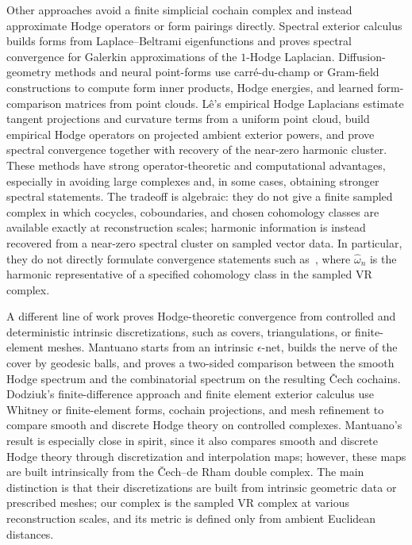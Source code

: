 \documentclass[11pt,reqno]{amsproc}
\numberwithin{equation}{section}
\theoremstyle{definition}
\theoremstyle{plain}
\begin{document}
Other approaches avoid a finite simplicial cochain complex and instead approximate Hodge operators or form pairings directly. Spectral exterior calculus \cite{Berry2020} builds forms from Laplace--Beltrami eigenfunctions and proves spectral convergence for Galerkin approximations of the $1$-Hodge Laplacian. Diffusion-geometry methods \cite{jones2026computing} and neural point-forms \cite{trentini2026neuralpointforms} use carr\'e-du-champ or Gram-field constructions to compute form inner products, Hodge energies, and learned form-comparison matrices from point clouds. L\^e's empirical Hodge Laplacians \cite{le_empirical_2026} estimate tangent projections and curvature terms from a uniform point cloud, build empirical Hodge operators on projected ambient exterior powers, and prove spectral convergence together with recovery of the near-zero harmonic cluster. 
These methods have strong operator-theoretic and computational advantages, especially in avoiding large complexes and, in some cases, obtaining stronger spectral statements. The tradeoff is algebraic: they do not give a finite sampled complex in which cocycles, coboundaries, and chosen cohomology classes are available exactly at reconstruction scales; harmonic information is instead recovered from a near-zero spectral cluster on sampled vector data. In particular, they do not directly formulate convergence statements such as~, where $\hat{\omega}_n$ is the harmonic representative of a specified cohomology class in the sampled VR complex.

A different line of work proves Hodge-theoretic convergence from controlled and deterministic intrinsic discretizations, such as covers, triangulations, or finite-element meshes. Mantuano \cite{mantuano_discretization_2008} starts from an intrinsic $\epsilon$-net, builds the nerve of the cover by geodesic balls, and proves a two-sided comparison between the smooth Hodge spectrum and the combinatorial spectrum on the resulting \v{C}ech cochains. Dodziuk's finite-difference approach and finite element exterior calculus \cite{dodziuk_finite-difference_1976,Arnold2010} use Whitney or finite-element forms, cochain projections, and mesh refinement to compare smooth and discrete Hodge theory on controlled complexes. Mantuano's result is especially close in spirit, since it also compares smooth and discrete Hodge theory through discretization and interpolation maps; however, these maps are built intrinsically from the \v{C}ech--de Rham double complex. The main distinction is that their discretizations are built from intrinsic geometric data or prescribed meshes; our complex is the sampled VR complex at various reconstruction scales, and its metric is defined only from ambient Euclidean distances. \medskip
\end{document}

